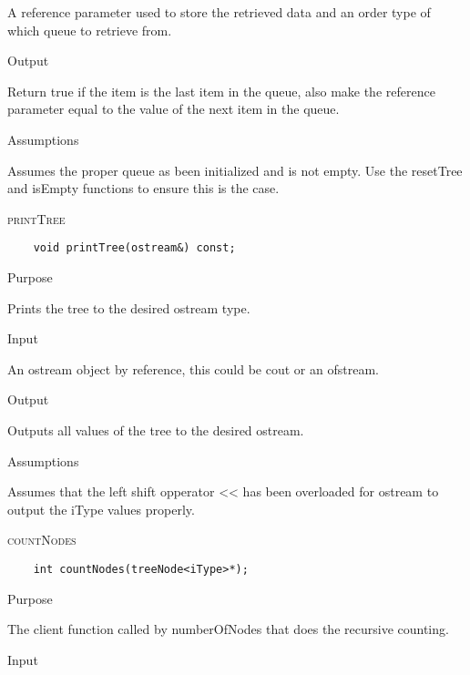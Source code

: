 \documentclass[pdftex, 12pt]{article}
\begin{document}
\begin{description}
\begin{description}
				A reference parameter used to store the retrieved data and an order type of which queue to retrieve
				from.

			\item{Output}

				Return true if the item is the last item in the queue, also make the reference parameter equal to the
				value of the next item in the queue.

			\item{Assumptions}

				Assumes the proper queue as been initialized and is not empty.  Use the resetTree and isEmpty functions
				to ensure this is the case.

		\end{description}
	\item{\textsc{printTree}}
\begin{lstlisting}
	void printTree(ostream&) const;
\end{lstlisting}
		\begin{description}

			\item{Purpose}

				Prints the tree to the desired ostream type.

			\item{Input}

				An ostream object by reference, this could be cout or an ofstream.

			\item{Output}

				Outputs all values of the tree to the desired ostream.

			\item{Assumptions}

				Assumes that the left shift opperator << has been overloaded for ostream to output the iType values
				properly.

		\end{description}
	\item{\textsc{countNodes}}
\begin{lstlisting}
	int countNodes(treeNode<iType>*);
\end{lstlisting}
		\begin{description}

			\item{Purpose}

				The client function called by numberOfNodes that does the recursive counting.

			\item{Input}


\end{description}
\end{description}
\end{document}
